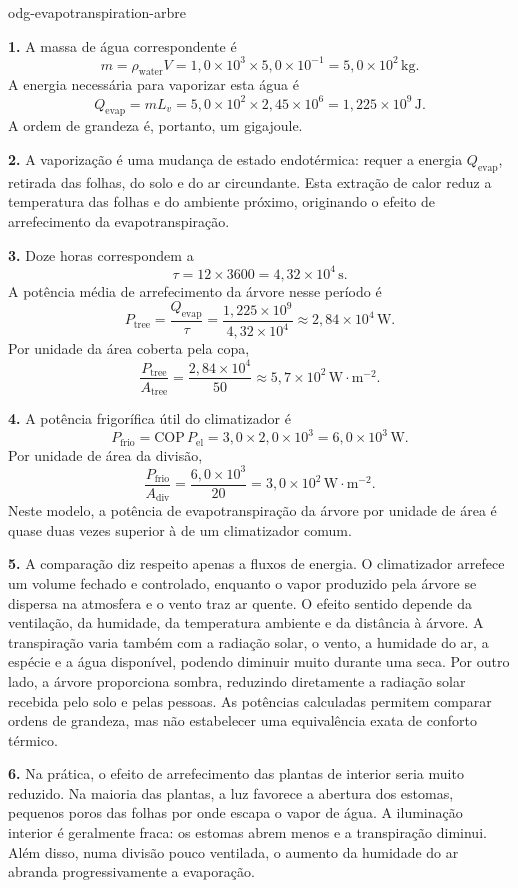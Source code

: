 \begin{exo}{odg-evapotranspiration-arbre}
\begin{solution}
\textbf{1.} A massa de água correspondente é
\[
m=\rho_{\text{water}}V
=1{,}0\times10^3\times5{,}0\times10^{-1}
=5{,}0\times10^2\,\text{kg}.
\]
A energia necessária para vaporizar esta água é
\[
Q_{\mathrm{evap}}=mL_v
=5{,}0\times10^2\times2{,}45\times10^6
=1{,}225\times10^9\,\text{J}.
\]
A ordem de grandeza é, portanto, um gigajoule.

\textbf{2.} A vaporização é uma mudança de estado endotérmica: requer a energia $Q_{\mathrm{evap}}$, retirada das folhas, do solo e do ar circundante. Esta extração de calor reduz a temperatura das folhas e do ambiente próximo, originando o efeito de arrefecimento da evapotranspiração.

\textbf{3.} Doze horas correspondem a
\[
\tau=12\times3600=4{,}32\times10^4\,\text{s}.
\]
A potência média de arrefecimento da árvore nesse período é
\[
P_{\text{tree}}=\frac{Q_{\mathrm{evap}}}{\tau}
=\frac{1{,}225\times10^9}{4{,}32\times10^4}
\approx2{,}84\times10^4\,\text{W}.
\]
Por unidade da área coberta pela copa,
\[
\frac{P_{\text{tree}}}{A_{\text{tree}}}
=\frac{2{,}84\times10^4}{50}
\approx5{,}7\times10^2\,\text{W}\!\cdot\!\text{m}^{-2}.
\]

\textbf{4.} A potência frigorífica útil do climatizador é
\[
P_{\text{frio}}=\mathrm{COP}\,P_{\mathrm{el}}
=3{,}0\times2{,}0\times10^3
=6{,}0\times10^3\,\text{W}.
\]
Por unidade de área da divisão,
\[
\frac{P_{\text{frio}}}{A_{\text{div}}}
=\frac{6{,}0\times10^3}{20}
=3{,}0\times10^2\,\text{W}\!\cdot\!\text{m}^{-2}.
\]
Neste modelo, a potência de evapotranspiração da árvore por unidade de área é quase duas vezes superior à de um climatizador comum.

\textbf{5.} A comparação diz respeito apenas a fluxos de energia. O climatizador arrefece um volume fechado e controlado, enquanto o vapor produzido pela árvore se dispersa na atmosfera e o vento traz ar quente. O efeito sentido depende da ventilação, da humidade, da temperatura ambiente e da distância à árvore. A transpiração varia também com a radiação solar, o vento, a humidade do ar, a espécie e a água disponível, podendo diminuir muito durante uma seca. Por outro lado, a árvore proporciona sombra, reduzindo diretamente a radiação solar recebida pelo solo e pelas pessoas. As potências calculadas permitem comparar ordens de grandeza, mas não estabelecer uma equivalência exata de conforto térmico.

\textbf{6.} Na prática, o efeito de arrefecimento das plantas de interior seria muito reduzido. Na maioria das plantas, a luz favorece a abertura dos estomas, pequenos poros das folhas por onde escapa o vapor de água. A iluminação interior é geralmente fraca: os estomas abrem menos e a transpiração diminui. Além disso, numa divisão pouco ventilada, o aumento da humidade do ar abranda progressivamente a evaporação.


\end{solution}
\end{exo}
